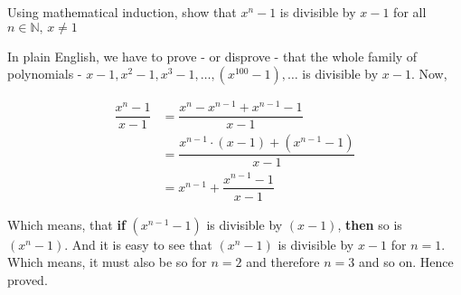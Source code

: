 
\question[3] Using mathematical induction, show that $x^n-1$ is divisible by $x-1$ for all $n\in\mathbb{N},\, x\neq 1$

\insertQR{}

\begin{solution}[\halfpage]
  In plain English, we have to prove - or disprove - that the whole family of polynomials
  - $x-1, x^2-1, x^3-1,\ldots, (x^{100}-1),\ldots$ is divisible by $x-1$. Now,

  \begin{align}
    \dfrac{x^n-1}{x-1} &= \dfrac{x^n - x^{n-1} + x^{n-1} - 1}{x-1} \\
                       &= \dfrac{x^{n-1}\cdot (x-1) + (x^{n-1} - 1)}{x - 1} \\
                       &= x^{n-1} + \dfrac{x^{n-1} - 1}{x-1}
  \end{align}
  
  Which means, that \textbf{if} $(x^{n-1}-1)$ is divisible by $(x-1)$, \textbf{then} so is $(x^n-1)$. 
  And it is easy to see that $(x^n-1)$ is divisible by $x-1$ for $n=1$. Which means, it must 
  also be so for $n=2$ and therefore $n=3$ and so on. Hence proved.
\end{solution}

